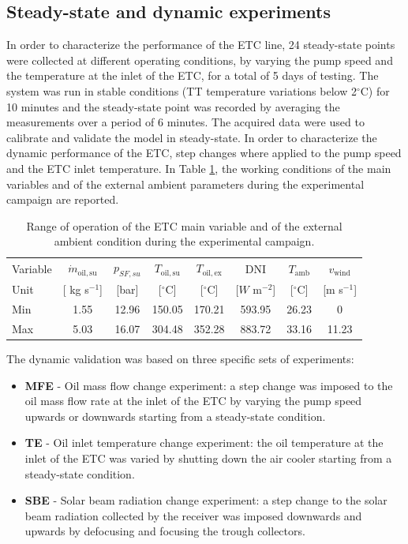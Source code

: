\documentclass[final,3p,times,review]{elsarticle}
\begin{document}
\subsection{Steady-state and dynamic experiments}
%
In order to characterize the performance of the ETC line, 24 steady-state points were collected at different operating conditions, by varying the pump speed and the temperature at the inlet of the ETC, for a total of 5 days of testing. The system was run in stable conditions (TT temperature variations
below 2$^{\circ}$C) for 10 minutes and the steady-state point was recorded by averaging the measurements over a period of 6 minutes. The acquired data were used to calibrate and validate the model in steady-state.
In order to characterize the dynamic performance of the ETC, step changes where applied to the pump speed and the ETC inlet temperature. In Table \ref{Tab:SF_workCond}, the working conditions of the main variables and of the external ambient parameters during the experimental campaign are reported. 
%
\begin{table}[h!]
\centering
\caption{Range of operation of the ETC main variable and of the external ambient condition during the experimental campaign.}
\begin{tabular}{lccccccc}
\toprule
 Variable & $\dot{m}_\mathrm{oil,su}$ & $p_{SF,su}$  &$T_\mathrm{oil,su}$  & $T_\mathrm{oil,ex}$ &  DNI &  $T_\mathrm{amb}$ & $v_\mathrm{wind}$ \\
Unit &  [ kg s$^{-1}$] & [bar] & [$^{\circ}$C] &  [$^{\circ}$C]&  [$W$ m$^{-2}$] &  [$^{\circ}$C] &  [m s$^{-1}$] \\
\toprule
Min & 1.55      &   12.96 & 150.05  &   170.21  &   593.95  &   26.23 &   0  \\
Max & 5.03      &   16.07 & 304.48  &   352.28  &   883.72  &   33.16 &   11.23  \\
\bottomrule
\end{tabular}
\label{Tab:SF_workCond}
\end{table}
%
The dynamic validation was based on three specific sets of experiments:
%
\begin{itemize}
\item \textbf{MFE} - Oil mass flow change experiment: a step change was imposed to the oil mass flow rate at the inlet of the ETC by varying the pump speed upwards or downwards starting from a steady-state condition.
\item \textbf{TE} - Oil inlet temperature change experiment: the oil temperature at the inlet of the ETC was varied by shutting down the air cooler starting from a steady-state condition. 
\item \textbf{SBE} - Solar beam radiation change experiment: a step change to the solar beam radiation collected by the receiver was imposed downwards and upwards by defocusing and focusing the trough collectors.
\end{itemize} 
%
\end{document}
